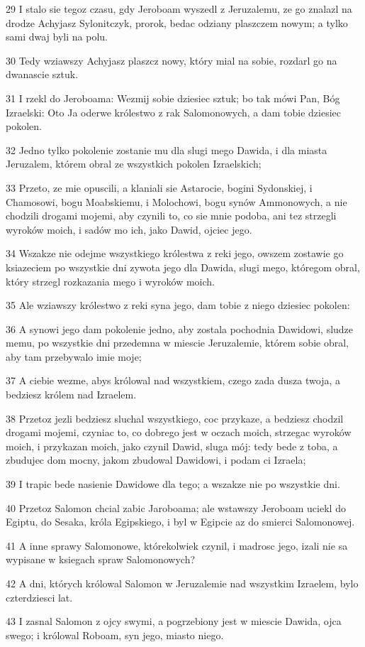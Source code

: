 \par 29 I stalo sie tegoz czasu, gdy Jeroboam wyszedl z Jeruzalemu, ze go znalazl na drodze Achyjasz Sylonitczyk, prorok, bedac odziany plaszczem nowym; a tylko sami dwaj byli na polu.
\par 30 Tedy wziawszy Achyjasz plaszcz nowy, który mial na sobie, rozdarl go na dwanascie sztuk.
\par 31 I rzekl do Jeroboama: Wezmij sobie dziesiec sztuk; bo tak mówi Pan, Bóg Izraelski: Oto Ja oderwe królestwo z rak Salomonowych, a dam tobie dziesiec pokolen.
\par 32 Jedno tylko pokolenie zostanie mu dla slugi mego Dawida, i dla miasta Jeruzalem, którem obral ze wszystkich pokolen Izraelskich;
\par 33 Przeto, ze mie opuscili, a klaniali sie Astarocie, bogini Sydonskiej, i Chamosowi, bogu Moabskiemu, i Molochowi, bogu synów Ammonowych, a nie chodzili drogami mojemi, aby czynili to, co sie mnie podoba, ani tez strzegli wyroków moich, i sadów mo ich, jako Dawid, ojciec jego.
\par 34 Wszakze nie odejme wszystkiego królestwa z reki jego, owszem zostawie go ksiazeciem po wszystkie dni zywota jego dla Dawida, slugi mego, któregom obral, który strzegl rozkazania mego i wyroków moich.
\par 35 Ale wziawszy królestwo z reki syna jego, dam tobie z niego dziesiec pokolen:
\par 36 A synowi jego dam pokolenie jedno, aby zostala pochodnia Dawidowi, sludze memu, po wszystkie dni przedemna w miescie Jeruzalemie, którem sobie obral, aby tam przebywalo imie moje;
\par 37 A ciebie wezme, abys królowal nad wszystkiem, czego zada dusza twoja, a bedziesz królem nad Izraelem.
\par 38 Przetoz jezli bedziesz sluchal wszystkiego, coc przykaze, a bedziesz chodzil drogami mojemi, czyniac to, co dobrego jest w oczach moich, strzegac wyroków moich, i przykazan moich, jako czynil Dawid, sluga mój: tedy bede z toba, a zbudujec dom mocny, jakom zbudowal Dawidowi, i podam ci Izraela;
\par 39 I trapic bede nasienie Dawidowe dla tego; a wszakze nie po wszystkie dni.
\par 40 Przetoz Salomon chcial zabic Jaroboama; ale wstawszy Jeroboam uciekl do Egiptu, do Sesaka, króla Egipskiego, i byl w Egipcie az do smierci Salomonowej.
\par 41 A inne sprawy Salomonowe, którekolwiek czynil, i madrosc jego, izali nie sa wypisane w ksiegach spraw Salomonowych?
\par 42 A dni, których królowal Salomon w Jeruzalemie nad wszystkim Izraelem, bylo czterdziesci lat.
\par 43 I zasnal Salomon z ojcy swymi, a pogrzebiony jest w miescie Dawida, ojca swego; i królowal Roboam, syn jego, miasto niego.

